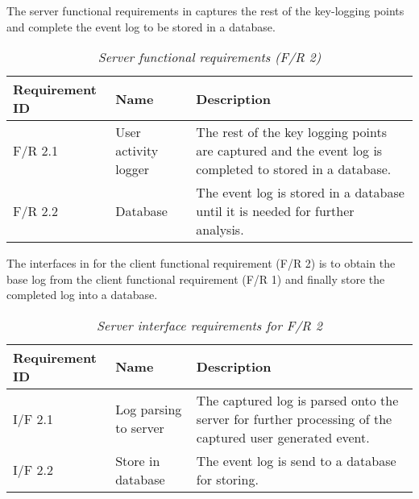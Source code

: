The server functional requirements in  captures the rest of the key-logging points and complete the event log to be stored in a database. 

\begin{table}[!htb]
	\centering
	\small
	\caption[Server functional requirements]
	{\textit{Server functional requirements (F/R 2)}}
	\label{tbl:Ch2_Server_Functional_Requirements}
	\begin{tabularx}{\textwidth}{|l|l|X|}
		\hline \textbf{Requirement ID} & \textbf{Name} & \textbf{Description} \\
		\hline F/R 2.1 & User activity logger & The rest of the key logging points are captured and the event log is completed to stored in a database.\\
		\hline F/R 2.2 & Database & The event log is stored in a database until it is needed for further analysis.\\
		\hline
	\end{tabularx}
\end{table}

The interfaces in  for the client functional requirement (F/R 2) is to obtain the base log from the client functional requirement (F/R 1) and finally store the completed log into a database.

\begin{table}[!htb]
	\centering
	\small
	\caption[Server interface requirements]
	{\textit{Server interface requirements for F/R 2}}
	\label{tbl:Ch2_Server_Interface_Requirements}
	\begin{tabularx}{\textwidth}{|l|l|X|}
		\hline \textbf{Requirement ID} & \textbf{Name} & \textbf{Description} \\
		\hline I/F 2.1 & Log parsing to server & The captured log is parsed onto the server for further processing of the captured user generated event.\\
		\hline I/F 2.2 & Store in database & The event log is send to a database for storing.\\
		\hline
	\end{tabularx}
\end{table}

\clearpage


